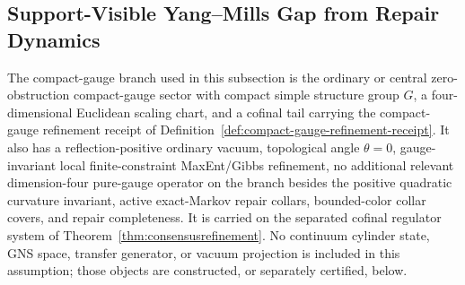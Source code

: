 \subsection{Support-Visible Yang--Mills Gap from Repair Dynamics}
\label{app:yang-mills-repair-gap}

\begin{assumption}
\label{ass:oph-yang-mills-branch}
The compact-gauge branch used in this subsection is the ordinary or central zero-obstruction
compact-gauge sector with compact simple structure group \(G\), a four-dimensional Euclidean
scaling chart, and a cofinal tail carrying the compact-gauge refinement receipt of
Definition~\ref{def:compact-gauge-refinement-receipt}. It also has a reflection-positive ordinary
vacuum, topological angle \(\theta=0\), gauge-invariant
local finite-constraint MaxEnt/Gibbs refinement, no additional relevant dimension-four pure-gauge
operator on the branch besides the positive quadratic curvature invariant, active exact-Markov
repair collars, bounded-color collar covers, and repair completeness. It is carried on the
separated cofinal regulator system of Theorem~\ref{thm:consensusrefinement}. No continuum
cylinder state, GNS space, transfer generator, or vacuum projection is included in this
assumption; those objects are constructed, or separately certified, below.
\end{assumption}

